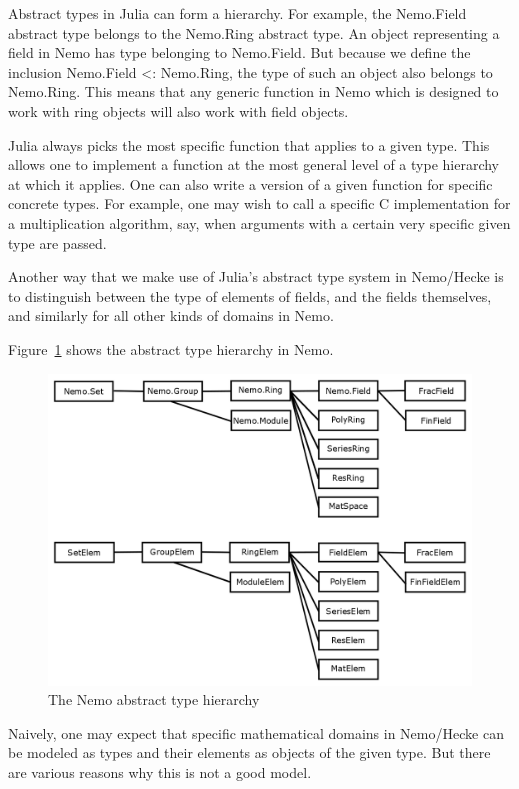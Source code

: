 \documentclass{sig-alternate-05-2015}
\begin{document}
Abstract types in Julia can form a hierarchy. For example, the Nemo.Field abstract type belongs
to the Nemo.Ring abstract type. An object representing a field in Nemo has type belonging to
Nemo.Field. But because we define the inclusion Nemo.Field <: Nemo.Ring, the type of such an
object also belongs to Nemo.Ring. This means that any generic function in Nemo which is designed
to work with ring objects will also work with field objects.

Julia always picks the most specific function that applies to a given type. This allows one to
implement a function at the most general level of a type hierarchy at which it applies. One can
also write a version of a given function for specific concrete types. For example, one may wish
to call a specific C implementation for a multiplication algorithm, say, when arguments with a
certain very specific given type are passed.

Another way that we make use of Julia's abstract type system in Nemo/Hecke is to distinguish
between the type of elements of fields, and the fields themselves, and similarly for all other
kinds of domains in Nemo. 

Figure~\ref{fig:types} shows the abstract type hierarchy in Nemo.

\begin{figure}[h]
\centering
\includegraphics[scale=0.19]{types.png}
\caption{The Nemo abstract type hierarchy}
\label{fig:types}
\end{figure}

Naively, one may expect that specific mathematical domains in Nemo/Hecke can be modeled as types
and their elements as objects of the given type. But there are various reasons why this is not a
good model.
\end{document}
